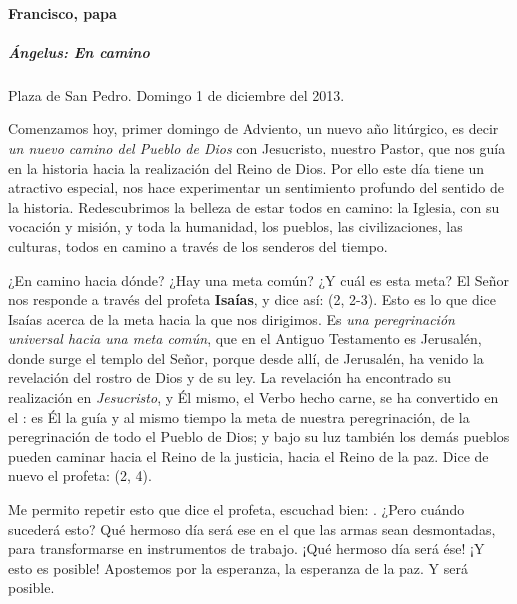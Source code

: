 \documentclass[]{article}
\let\oldparagraph\paragraph
\renewcommand{\paragraph}[1]{\oldparagraph{#1}\mbox{}}
\let\oldsubparagraph\subparagraph
\renewcommand{\subparagraph}[1]{\oldsubparagraph{#1}\mbox{}}
\begin{document}
\paragraph{Francisco, papa}\label{francisco-papa}

\subparagraph{Ángelus: En camino}\label{uxe1ngelus-en-camino}

Plaza de San Pedro. Domingo 1 de diciembre del 2013.

Comenzamos hoy, primer domingo de Adviento, un nuevo año litúrgico, es decir \emph{un nuevo camino del Pueblo de Dios} con Jesucristo, nuestro Pastor, que nos guía en la historia hacia la realización del Reino de Dios. Por ello este día tiene un atractivo especial, nos hace experimentar un sentimiento profundo del sentido de la historia. Redescubrimos la belleza de estar todos en camino: la Iglesia, con su vocación y misión, y toda la humanidad, los pueblos, las civilizaciones, las culturas, todos en camino a través de los senderos del tiempo.

¿En camino hacia dónde? ¿Hay una meta común? ¿Y cuál es esta meta? El Señor nos responde a través del profeta \textbf{Isaías}, y dice así:  (2, 2-3). Esto es lo que dice Isaías acerca de la meta hacia la que nos dirigimos. Es \emph{una peregrinación universal hacia una meta común}, que en el Antiguo Testamento es Jerusalén, donde surge el templo del Señor, porque desde allí, de Jerusalén, ha venido la revelación del rostro de Dios y de su ley. La revelación ha encontrado su realización en \emph{Jesucristo}, y Él mismo, el Verbo hecho carne, se ha convertido en el : es Él la guía y al mismo tiempo la meta de nuestra peregrinación, de la peregrinación de todo el Pueblo de Dios; y bajo su luz también los demás pueblos pueden caminar hacia el Reino de la justicia, hacia el Reino de la paz. Dice de nuevo el profeta:  (2, 4).

Me permito repetir esto que dice el profeta, escuchad bien: . ¿Pero cuándo sucederá esto? Qué hermoso día será ese en el que las armas sean desmontadas, para transformarse en instrumentos de trabajo. ¡Qué hermoso día será ése! ¡Y esto es posible! Apostemos por la esperanza, la esperanza de la paz. Y será posible.
\end{document}
